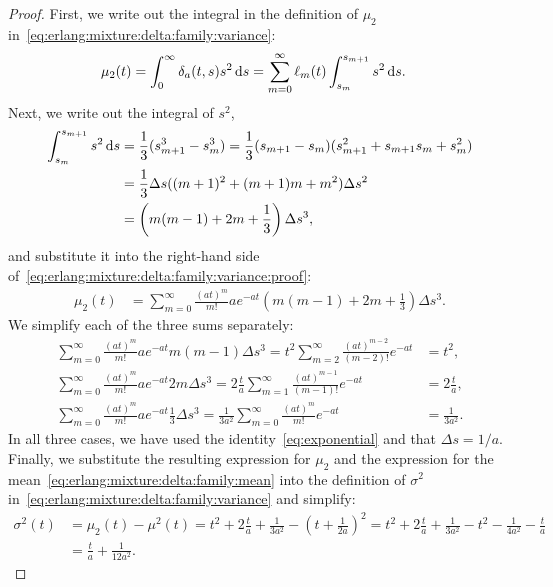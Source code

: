 \begin{proof}
	First, we write out the integral in the definition of $\mu_2$ in~\eqref{eq:erlang:mixture:delta:family:variance}:
	\begin{align}\label{eq:erlang:mixture:delta:family:variance:proof}
		\mu_2(t) &= \int_0^\infty \delta_a(t, s) s^2 \,\mathrm{d} s = \sum_{m=0}^\infty \ell_m(t) \int_{s_m}^{s_{m+1}} s^2 \,\mathrm{d} s.
	\end{align}
	Next, we write out the integral of $s^2$,
	\begin{align}
		\int_{s_m}^{s_{m+1}} s^2 \,\mathrm{d} s
		&= \frac{1}{3} (s_{m+1}^3 - s_m^3) = \frac{1}{3} (s_{m+1} - s_m) (s_{m+1}^2 + s_{m+1} s_m + s_m^2) \nonumber \\
		&= \frac{1}{3} \Delta s ((m+1)^2 + (m+1) m + m^2) \Delta s^2 \nonumber \\
		&= \left(m (m-1) + 2m + \frac{1}{3}\right) \Delta s^3,
	\end{align}
	and substitute it into the right-hand side of~\eqref{eq:erlang:mixture:delta:family:variance:proof}:
	\begin{align}
		\mu_2(t) &= \sum_{m=0}^\infty \frac{(at)^m}{m!} a e^{-at} \left(m (m-1) + 2m + \frac{1}{3}\right) \Delta s^3.
	\end{align}
	We simplify each of the three sums separately:
	\begin{subequations}\label{eq:erlang:mixture:delta:family:variance:terms}
		\begin{align}
			\sum_{m=0}^\infty \frac{(at)^m}{m!} a e^{-at} m (m-1) \Delta s^3
			= t^2 \sum_{m=2}^\infty \frac{(at)^{m-2}}{(m-2)!} e^{-at} &= t^2, \\
			\sum_{m=0}^\infty \frac{(at)^m}{m!} a e^{-at} 2m \Delta s^3
			= 2 \frac{t}{a} \sum_{m=1}^\infty \frac{(at)^{m-1}}{(m-1)!} e^{-at} &= 2 \frac{t}{a}, \\
			\sum_{m=0}^\infty \frac{(at)^m}{m!} a e^{-at} \frac{1}{3} \Delta s^3
			= \frac{1}{3 a^2} \sum_{m=0}^\infty \frac{(at)^m}{m!} e^{-at} &= \frac{1}{3 a^2}.
		\end{align}
	\end{subequations}
	In all three cases, we have used the identity~\eqref{eq:exponential} and that $\Delta s = 1/a$.
	Finally, we substitute the resulting expression for $\mu_2$ and the expression for the mean~\eqref{eq:erlang:mixture:delta:family:mean} into the definition of $\sigma^2$ in~\eqref{eq:erlang:mixture:delta:family:variance} and simplify:
	\begin{align}
		\sigma^2(t)
		&= \mu_2(t) - \mu^2(t) = t^2 + 2 \frac{t}{a} + \frac{1}{3 a^2} - \left(t + \frac{1}{2 a}\right)^2 = t^2 + 2 \frac{t}{a} + \frac{1}{3 a^2} - t^2 - \frac{1}{4 a^2} - \frac{t}{a} \\
		&= \frac{t}{a} + \frac{1}{12 a^2}. \nonumber
	\end{align}
\end{proof}

